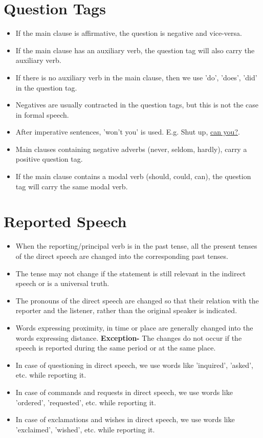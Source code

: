 	\section{Question Tags}
	\begin{itemize}
		\item If the main clause is affirmative, the question is negative and vice-versa.
		\item If the main clause has an auxiliary verb, the question tag will also carry the auxiliary verb.
		\item If there is no auxiliary verb in  the main clause, then we use 'do', 'does', 'did' in the question tag.
		\item Negatives are usually contracted in the question tags, but this is not the case in formal speech.
		\item After imperative sentences, 'won't you' is used. E.g. Shut up, \underline{can you?}.
		\item Main clauses containing negative adverbs (never, seldom, hardly), carry a positive question tag.
		\item If the main clause contains a modal verb (should, could, can), the question tag will carry the same modal verb. 
	\end{itemize}
	\section{Reported Speech}
	\begin{itemize}
		\item When the reporting/principal verb is in the past tense, all the present tenses of the direct speech are changed into the corresponding past tenses.
		\item The tense may not change if the statement is still relevant in the indirect speech or is a universal truth.
		\item The pronouns of the direct speech are changed so that their relation with the reporter and the listener, rather than the original speaker is indicated.
		\item Words expressing proximity, in time or place are generally changed into the words expressing distance. \textbf{Exception- } The changes do not occur if the speech is reported during the same period or at the same place.
		\item In case of questioning in direct speech, we use words like 'inquired', 'asked', etc. while reporting it.
		\item In case of commands and requests in direct speech, we use words like 'ordered', 'requested', etc. while reporting it.
		\item In case of exclamations and wishes in direct speech, we use words like 'exclaimed', 'wished', etc. while reporting it.
	\end{itemize}
